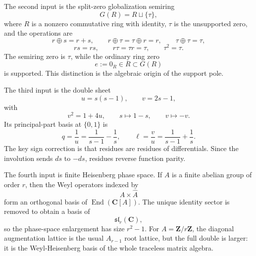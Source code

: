 \documentclass[11pt]{article}
\newcommand{\C}{\mathbf C}
\newcommand{\Z}{\mathbf Z}
\newcommand{\End}{\operatorname{End}}
\theoremstyle{plain}
\theoremstyle{definition}
\begin{document}
The second input is the split-zero globalization semiring
\[
   G(R)=R\sqcup\{\tau\},
\]
where \(R\) is a nonzero commutative ring with identity, \(\tau\) is the unsupported zero, and the operations are
\[
 r\oplus s=r+s,
 \qquad r\oplus\tau=\tau\oplus r=r,
 \qquad \tau\oplus\tau=\tau,
\]
\[
 rs=rs,
 \qquad r\tau=\tau r=\tau,
 \qquad \tau^2=\tau.
\]
The semiring zero is \(\tau\), while the ordinary ring zero
\[
   e:=0_R\in R\subset G(R)
\]
is supported.  This distinction is the algebraic origin of the support pole.

The third input is the double sheet
\[
   u=s(s-1),\qquad v=2s-1,
\]
with
\[
   v^2=1+4u,
   \qquad s\mapsto 1-s,
   \qquad v\mapsto -v.
\]
Its principal-part basis at \(\{0,1\}\) is
\[
   q=\frac1u=\frac1{s-1}-\frac1s,
   \qquad
   \ell=\frac vu=\frac1{s-1}+\frac1s.
\]
The key sign correction is that residues are residues of differentials.  Since the involution sends \(ds\) to \(-ds\), residues reverse function parity.

The fourth input is finite Heisenberg phase space.  If \(A\) is a finite abelian group of order \(r\), then the Weyl operators indexed by
\[
   A\times \widehat A
\]
form an orthogonal basis of \(\End(\C[A])\).  The unique identity sector is removed to obtain a basis of
\[
   \mathfrak{sl}_r(\C),
\]
so the phase-space enlargement has size \(r^2-1\).  For \(A=\Z/r\Z\), the diagonal augmentation lattice is the usual \(A_{r-1}\) root lattice, but the full double is larger: it is the Weyl-Heisenberg basis of the whole traceless matrix algebra.
\end{document}
